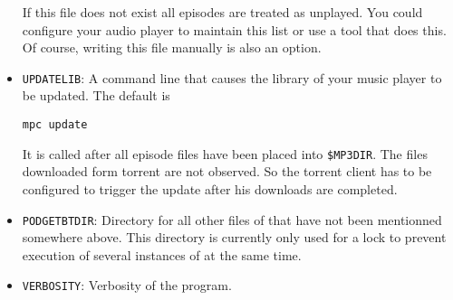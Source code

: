 \begin{itemize}
  If this file does not exist all episodes are treated as unplayed.
  You could configure your audio player to maintain this list or
  use a tool that does this.
  Of course, writing this file manually is also an option.
\item \texttt{UPDATELIB}:
  A command line that causes the library of your music player to be
  updated. The default is 
\begin{verbatim}
mpc update
\end{verbatim}
  It is called after all episode files have been placed into 
  \texttt{\$MP3DIR}.
  The files downloaded form torrent are not observed. So the torrent
  client has to be configured to trigger the update after his 
  downloads are completed.
\item \texttt{PODGETBTDIR}:
  Directory for all other files of \podgetbt{} that have
  not been mentionned somewhere above.
  This directory is currently only used for a lock to prevent
  execution of several instances of \podgetbt{} at the same time.
\item \texttt{VERBOSITY}:
  Verbosity of the program.
\end{itemize}

